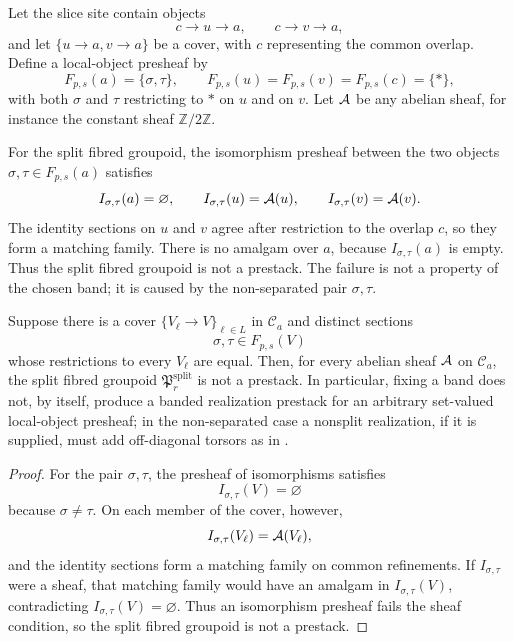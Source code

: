 \begin{example}\label{ex:nonseparated-split-lift}
Let the slice site contain objects
\[
c\to u\to a,
\qquad
c\to v\to a,
\]
and let $\{u\to a,v\to a\}$ be a cover, with $c$ representing the common overlap. Define a local-object presheaf by
\[
F_{p,s}(a)=\{\sigma,\tau\},
\qquad
F_{p,s}(u)=F_{p,s}(v)=F_{p,s}(c)=\{*\},
\]
with both $\sigma$ and $\tau$ restricting to $*$ on $u$ and on $v$. Let $\mathcal{A}$ be any abelian sheaf, for instance the constant sheaf $\mathbb Z/2\mathbb Z$.

For the split fibred groupoid, the isomorphism presheaf between the two objects $\sigma,\tau\in F_{p,s}(a)$ satisfies
\[
I_{\sigma,\tau}(a)=\varnothing,
\qquad
I_{\sigma,\tau}(u)=\mathcal{A}(u),
\qquad
I_{\sigma,\tau}(v)=\mathcal{A}(v).
\]
The identity sections on $u$ and $v$ agree after restriction to the overlap $c$, so they form a matching family. There is no amalgam over $a$, because $I_{\sigma,\tau}(a)$ is empty. Thus the split fibred groupoid is not a prestack. The failure is not a property of the chosen band; it is caused by the non-separated pair $\sigma,\tau$.
\end{example}

\begin{corollary}\label{cor:nonseparated-split-fails}
Suppose there is a cover $\{V_\ell\to V\}_{\ell\in L}$ in $\mathcal C_a$ and distinct sections
\[
\sigma,\tau\in F_{p,s}(V)
\]
whose restrictions to every $V_\ell$ are equal. Then, for every abelian sheaf $\mathcal{A}$ on $\mathcal C_a$, the split fibred groupoid $\mathfrak P_r^{\mathrm{split}}$ is not a prestack. In particular, fixing a band does not, by itself, produce a banded realization prestack for an arbitrary set-valued local-object presheaf; in the non-separated case a nonsplit realization, if it is supplied, must add off-diagonal torsors as in .
\end{corollary}

\begin{proof}
For the pair $\sigma,\tau$, the presheaf of isomorphisms satisfies
\[
I_{\sigma,\tau}(V)=\varnothing
\]
because $\sigma\neq\tau$. On each member of the cover, however,
\[
I_{\sigma,\tau}(V_\ell)=\mathcal{A}(V_\ell),
\]
and the identity sections form a matching family on common refinements. If $I_{\sigma,\tau}$ were a sheaf, that matching family would have an amalgam in $I_{\sigma,\tau}(V)$, contradicting $I_{\sigma,\tau}(V)=\varnothing$. Thus an isomorphism presheaf fails the sheaf condition, so the split fibred groupoid is not a prestack.
\end{proof}

